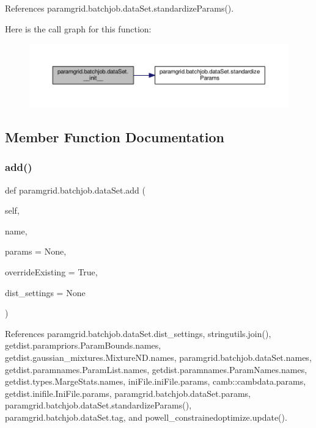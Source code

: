 References paramgrid.\+batchjob.\+data\+Set.\+standardize\+Params().

Here is the call graph for this function\+:
\nopagebreak
\begin{figure}[H]
\begin{center}
\leavevmode
\includegraphics[width=350pt]{classparamgrid_1_1batchjob_1_1dataSet_a70de259072c5e4c65eb476449bbebf9f_cgraph}
\end{center}
\end{figure}


\subsection{Member Function Documentation}
\mbox{\label{classparamgrid_1_1batchjob_1_1dataSet_aaf45e016ba6fb5889f4df3c6993b017a}} 
\subsubsection{\texorpdfstring{add()}{add()}}
{\footnotesize\ttfamily def paramgrid.\+batchjob.\+data\+Set.\+add (\begin{DoxyParamCaption}\item[{}]{self,  }\item[{}]{name,  }\item[{}]{params = {\ttfamily None},  }\item[{}]{override\+Existing = {\ttfamily True},  }\item[{}]{dist\+\_\+settings = {\ttfamily None} }\end{DoxyParamCaption})}



References paramgrid.\+batchjob.\+data\+Set.\+dist\+\_\+settings, stringutils.\+join(), getdist.\+parampriors.\+Param\+Bounds.\+names, getdist.\+gaussian\+\_\+mixtures.\+Mixture\+N\+D.\+names, paramgrid.\+batchjob.\+data\+Set.\+names, getdist.\+paramnames.\+Param\+List.\+names, getdist.\+paramnames.\+Param\+Names.\+names, getdist.\+types.\+Marge\+Stats.\+names, ini\+File.\+ini\+File.\+params, camb\+::cambdata.\+params, getdist.\+inifile.\+Ini\+File.\+params, paramgrid.\+batchjob.\+data\+Set.\+params, paramgrid.\+batchjob.\+data\+Set.\+standardize\+Params(), paramgrid.\+batchjob.\+data\+Set.\+tag, and powell\+\_\+constrainedoptimize.\+update().



